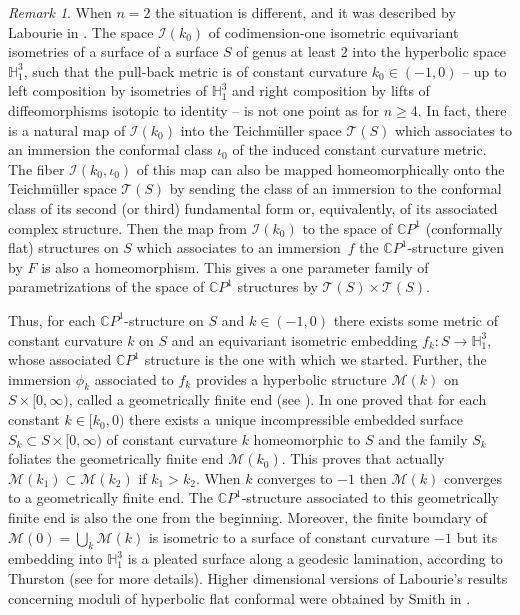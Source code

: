 \documentclass[JEP,XML,SOM,Unicode]{cedram}
\let\mathcal\mathscr
\theoremstyle{definition}
\theoremstyle{remark}
\newtheorem{remark}[theorem]{Remark}
\numberwithin{equation}{section}
\begin{document}
\begin{remark}
When $n=2$ the situation is different, and it was described by Labourie
in \cite{Lab}. The space $\mathcal I(k_0)$
of codimension-one isometric equivariant isometries of a
surface of a surface $S$ of genus at least $2$
into the hyperbolic space $\mathbb H_1^{3}$, such that
the pull-back metric is of constant curvature $k_0\in(-1,0)$ --
up to left composition by isometries of
$\mathbb H_1^{3}$ and right composition by lifts of diffeomorphisms
isotopic to identity -- is not one point as for $n\geq4$.
In fact, there is a natural map of $\mathcal I(k_0)$ into
the Teichmüller space $\mathcal T(S)$ which associates
to an immersion the conformal class $\iota_0$ of the induced
constant curvature metric. The fiber $\mathcal I(k_0,\iota_0)$ of this map
can also be mapped homeomorphically onto the Teichmüller space
$\mathcal T(S)$ by sending the class of an immersion
to the conformal class of its second (or third) fundamental form
or, equivalently, of its associated complex structure. Then
the map from $\mathcal I(k_0)$ to the space of $\mathbb CP^1$ (\ie conformally flat) structures on $S$ which associates to an immersion~$f$ the $\mathbb CP^1$-structure given by $F$ is also a homeomorphism.
This gives a one parameter family of parametrizations of the space of
$\mathbb CP^1$ structures by $\mathcal T(S)\times \mathcal T(S)$.

Thus, for each $\mathbb CP^1$-structure on $S$ and $k\in (-1,0)$
there exists some metric of constant curvature $k$ on $S$ and an
equivariant isometric embedding $f_k:S\to \mathbb H_1^{3}$, whose associated
$\mathbb CP^1$ structure is the one with which we started.
Further, the immersion $\phi_k$ associated to $f_k$ provides
a hyperbolic structure $\mathcal M(k)$ on
$S\times [0,\infty)$, called a geometrically finite end (see \cite{Lab}).
In \cite{Lab,Lab2} one proved that for each constant $k\in [k_0,0)$ there exists a unique incompressible embedded surface $S_{k}\subset S\times [0,\infty)$
of constant curvature $k$ homeomorphic to $S$ and the family $S_{k}$ foliates
the geometrically finite end $\mathcal M(k_0)$.
This proves that actually $\mathcal M(k_1) \subset \mathcal M(k_2)$
if $k_1 > k_2$. When $k$ converges to $-1$ then
$\mathcal M(k)$ converges to a geometrically finite end.
The $\mathbb CP^1$-structure associated to this geometrically finite end is
also the one from the beginning. Moreover, the finite
boundary of $\mathcal M(0)=\bigcup_{k}\mathcal M(k)$ is isometric
to a surface of constant curvature $-1$ but its embedding
into $\mathbb H_1^3$ is a pleated surface
along a geodesic lamination, according to Thurston (see \cite{Lab} for
more details). Higher dimensional versions of Labourie's results
concerning moduli of hyperbolic flat conformal were obtained
by Smith in \cite{Smith}.
\end{remark}

\backmatter


\end{document}
